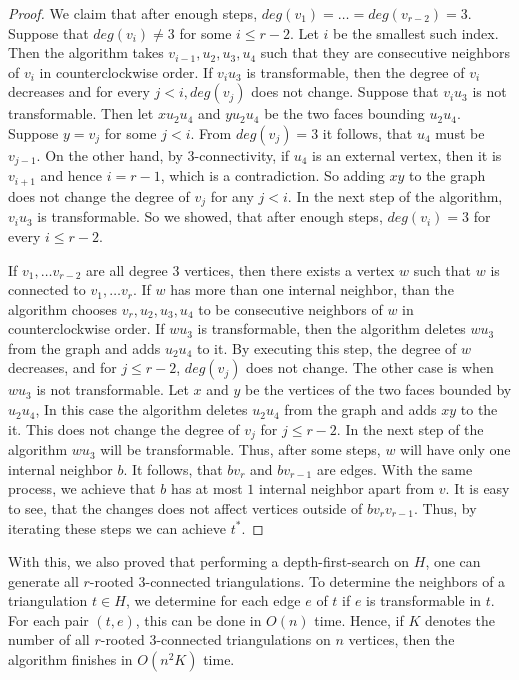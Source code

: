 \begin{proof}
  We claim that after enough steps, $deg(v_1) = \dots = deg(v_{r - 2}) = 3$.
  Suppose that $deg(v_i) \neq 3$ for some $i \le r - 2$. Let $i$ be the smallest such index.
  Then the algorithm takes $v_{i - 1}, u_2, u_3, u_4$ such that they are consecutive neighbors of $v_i$
  in counterclockwise order. If $v_iu_3$ is transformable, then the degree of $v_i$
  decreases and for every $j < i, deg(v_j)$ does not change. Suppose that $v_iu_3$
  is not transformable. Then let $xu_2u_4$ and $yu_2u_4$ be the two faces bounding $u_2u_4$.
  Suppose $y = v_j$ for some $j < i$. From $deg(v_j) = 3$ it follows, that $u_4$ must be $v_{j - 1}$.
  On the other hand, by $3$-connectivity, if $u_4$ is an external vertex, then it
  is $v_{i + 1}$ and hence $i = r - 1$, which is a contradiction. So adding $xy$ to the graph
  does not change the degree of $v_j$ for any $j < i$. In the next step of the algorithm,
  $v_iu_3$ is transformable. So we showed, that after enough steps, $deg(v_i) = 3$ for every $i \le r - 2$.

  If $v_1, \dots v_{r - 2}$ are all degree $3$ vertices, then there exists a vertex $w$
  such that $w$ is connected to $v_1, \dots v_r$. If $w$ has
  more than one internal neighbor, than the algorithm chooses $v_r, u_2, u_3, u_4$ to
  be consecutive neighbors of $w$ in counterclockwise order. If $wu_3$ is transformable,
  then the algorithm deletes $wu_3$ from the graph and adds $u_2u_4$ to it. By executing this step,
  the degree of $w$ decreases, and for $j \le r - 2$, $deg(v_j)$ does not change.
  The other case is when $wu_3$ is not transformable. Let $x$ and $y$ be the
  vertices of the two faces bounded by $u_2u_4$, In this case the algorithm
  deletes $u_2u_4$ from the graph and adds $xy$ to the it. This does not change the
  degree of $v_j$ for $j \le r - 2$. In the next step of the algorithm $wu_3$ will be
  transformable. Thus, after some steps, $w$ will have only one internal neighbor $b$.
  It follows, that $bv_r$ and $bv_{r - 1}$ are edges. With the same process, we
  achieve that $b$ has at most $1$ internal neighbor apart from $v$. It is easy to see, that
  the changes does not affect vertices outside of $bv_rv_{r - 1}$. Thus, by iterating these
  steps we can achieve $t^*$.
\end{proof}

With this, we also proved that performing a depth-first-search on $H$, one
can generate all $r$-rooted $3$-connected triangulations. To determine the neighbors
of a triangulation $t \in H$, we determine for each edge $e$ of $t$ if $e$ is transformable in $t$.
For each pair $(t, e)$, this can be done in $O(n)$ time. Hence, if
$K$ denotes the number of all $r$-rooted $3$-connected triangulations on $n$ vertices, then
the algorithm finishes in $O(n^2K)$ time.
